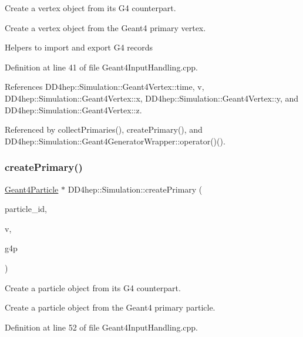 Create a vertex object from it\textquotesingle{}s G4 counterpart. 

Create a vertex object from the Geant4 primary vertex.

Helpers to import and export G4 records 

Definition at line 41 of file Geant4\+Input\+Handling.\+cpp.



References D\+D4hep\+::\+Simulation\+::\+Geant4\+Vertex\+::time, v, D\+D4hep\+::\+Simulation\+::\+Geant4\+Vertex\+::x, D\+D4hep\+::\+Simulation\+::\+Geant4\+Vertex\+::y, and D\+D4hep\+::\+Simulation\+::\+Geant4\+Vertex\+::z.



Referenced by collect\+Primaries(), create\+Primary(), and D\+D4hep\+::\+Simulation\+::\+Geant4\+Generator\+Wrapper\+::operator()().

\hypertarget{namespace_d_d4hep_1_1_simulation_a4ba463edde87d20831a604346d29a129}{}\label{namespace_d_d4hep_1_1_simulation_a4ba463edde87d20831a604346d29a129} 
\subsubsection{\texorpdfstring{create\+Primary()}{createPrimary()}\hspace{0.1cm}{\footnotesize\ttfamily [2/3]}}
{\footnotesize\ttfamily \hyperlink{class_d_d4hep_1_1_simulation_1_1_geant4_particle}{Geant4\+Particle} $\ast$ D\+D4hep\+::\+Simulation\+::create\+Primary (\begin{DoxyParamCaption}\item[{int}]{particle\+\_\+id,  }\item[{const \hyperlink{class_d_d4hep_1_1_simulation_1_1_geant4_vertex}{Geant4\+Vertex} $\ast$}]{v,  }\item[{const G4\+Primary\+Particle $\ast$}]{g4p }\end{DoxyParamCaption})}



Create a particle object from it\textquotesingle{}s G4 counterpart. 

Create a particle object from the Geant4 primary particle. 

Definition at line 52 of file Geant4\+Input\+Handling.\+cpp.



